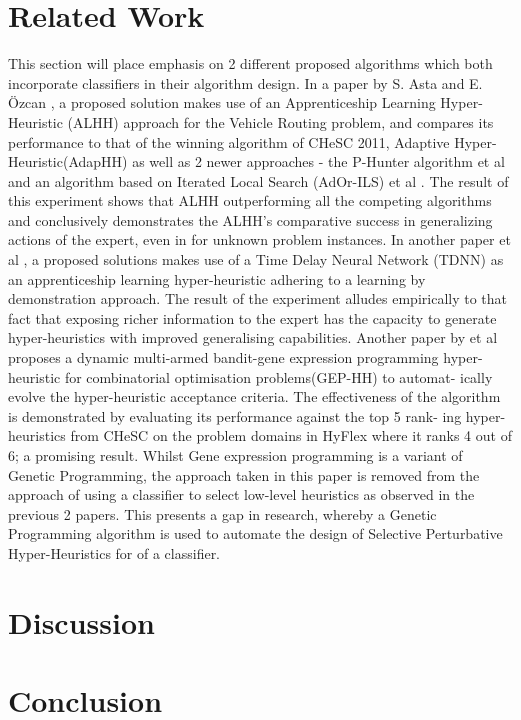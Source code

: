 \documentclass[a4paper,12pt]{article}
\begin{document}
\section{Related Work}  \label{sec:relwork}
    \par{
        This section will place emphasis on 2 different proposed algorithms 
        which both incorporate classifiers in their algorithm design.\newline 
        \newline 
        In a paper by S. Asta and E. Özcan \cite{astaozcan}, a proposed solution 
        makes use of an Apprenticeship Learning Hyper-Heuristic (ALHH) approach 
        for the Vehicle Routing problem, and compares its performance to that of 
        the winning algorithm of CHeSC 2011, Adaptive Hyper-Heuristic(AdapHH) as well 
        as 2 newer approaches - the P-Hunter algorithm et al   and an algorithm 
        based on Iterated Local Search (AdOr-ILS) et al \cite{ILS} . The result of 
        this experiment shows that ALHH outperforming all the competing algorithms and 
        conclusively demonstrates the ALHH’s comparative success in generalizing actions of 
        the expert, even in for unknown problem instances.\newline 
        \newline 
        In another paper et al \cite{tdnn} , a proposed solutions makes use of a Time Delay Neural
        Network (TDNN) as an apprenticeship learning hyper-heuristic adhering
        to a learning by demonstration approach. The result of the experiment alludes
        empirically to that fact that exposing richer information to the expert has the
        capacity to generate hyper-heuristics with improved generalising capabilities.
        Another paper by et al \cite{gehh} proposes a dynamic multi-armed bandit-gene expression programming
        hyper-heuristic for combinatorial optimisation problems(GEP-HH) to automat-
        ically evolve the hyper-heuristic acceptance criteria. The effectiveness of the
        algorithm is demonstrated by evaluating its performance against the top 5 rank-
        ing hyper-heuristics from CHeSC on the problem domains in HyFlex where it
        ranks 4 out of 6; a promising result.\newline 
        \newline 
        Whilst Gene expression programming is a variant of Genetic Programming, the
        approach taken in this paper is removed from the approach of using a classifier to
        select low-level heuristics as observed in the previous 2 papers. This presents a
        gap in research, whereby a Genetic Programming algorithm is used to automate
        the design of Selective Perturbative Hyper-Heuristics for of a classifier.
    }
\section{Discussion} \label{sec:discussion}
    \par{

    }
\section{Conclusion} \label{sec:conclusion}
    \par{

    }
\newpage
% 

\end{document}
